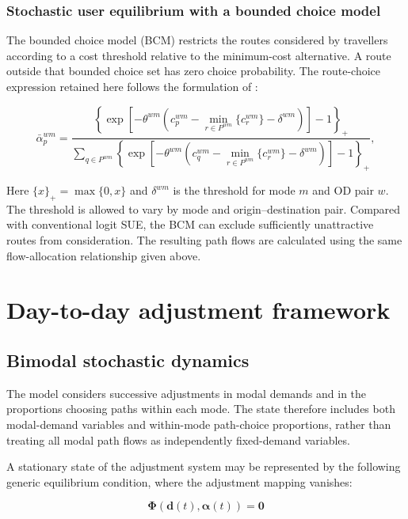 \documentclass[11pt,a4paper]{article}
\begin{document}
\subsubsection{Stochastic user equilibrium with a bounded choice model}

The bounded choice model (BCM) restricts the routes considered by travellers according to a cost threshold relative to the minimum-cost alternative. A route outside that bounded choice set has zero choice probability. The route-choice expression retained here follows the formulation of \citet{watling2018}:

\begin{equation}
\bar{\alpha}_p^{wm}=\frac{
\left\{\exp\!\left[-\theta^{wm}\!\left(c_p^{wm}-\min_{r\in P^{wm}}\{c_r^{wm}\}-\delta^{wm}\right)\right]-1\right\}_+
}{
\displaystyle\sum_{q\in P^{wm}}\left\{\exp\!\left[-\theta^{wm}\!\left(c_q^{wm}-\min_{r\in P^{wm}}\{c_r^{wm}\}-\delta^{wm}\right)\right]-1\right\}_+
},
\label{eq:bcm-route}
\end{equation}

Here $\{x\}_+=\max\{0,x\}$ and $\delta^{wm}$ is the threshold for mode $m$ and OD pair $w$. The threshold is allowed to vary by mode and origin--destination pair. Compared with conventional logit SUE, the BCM can exclude sufficiently unattractive routes from consideration. The resulting path flows are calculated using the same flow-allocation relationship given above.


\section{Day-to-day adjustment framework}\label{sec:adjustment}


\subsection{Bimodal stochastic dynamics}

The model considers successive adjustments in modal demands and in the proportions choosing paths within each mode. The state therefore includes both modal-demand variables and within-mode path-choice proportions, rather than treating all modal path flows as independently fixed-demand variables.

A stationary state of the adjustment system may be represented by the following generic equilibrium condition, where the adjustment mapping vanishes:

\begin{equation}
\bm\Phi\!\left(\mathbf d(t),\bm\alpha(t)\right)=\mathbf 0
\label{eq:stationary}
\end{equation}
\end{document}
